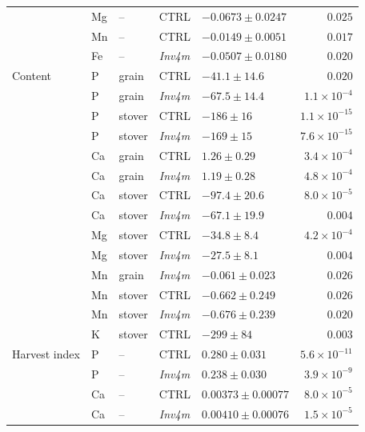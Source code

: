 \documentclass[9pt,twocolumn,twoside]{rilabRxiv}
\newcommand{\invfour}{\textit{Inv4m}\xspace}
\begin{document}
\begin{table}[!ht]
\begin{tabular}{lllllr}
 & Mg & -- & CTRL & $-0.0673 \pm 0.0247$ & $0.025$ \\
 & Mn & -- & CTRL & $-0.0149 \pm 0.0051$ & $0.017$ \\
 & Fe & -- & \invfour & $-0.0507 \pm 0.0180$ & $0.020$ \\
\hline
Content & P & grain & CTRL & $-41.1 \pm 14.6$ & $0.020$ \\
 & P & grain & \invfour & $-67.5 \pm 14.4$ & $1.1\times 10^{-4}$ \\
 & P & stover & CTRL & $-186 \pm 16$ & $1.1\times 10^{-15}$ \\
 & P & stover & \invfour & $-169 \pm 15$ & $7.6\times 10^{-15}$ \\
 & Ca & grain & CTRL & $1.26 \pm 0.29$ & $3.4\times 10^{-4}$ \\
 & Ca & grain & \invfour & $1.19 \pm 0.28$ & $4.8\times 10^{-4}$ \\
 & Ca & stover & CTRL & $-97.4 \pm 20.6$ & $8.0\times 10^{-5}$ \\
 & Ca & stover & \invfour & $-67.1 \pm 19.9$ & $0.004$ \\
 & Mg & stover & CTRL & $-34.8 \pm 8.4$ & $4.2\times 10^{-4}$ \\
 & Mg & stover & \invfour & $-27.5 \pm 8.1$ & $0.004$ \\
 & Mn & grain & \invfour & $-0.061 \pm 0.023$ & $0.026$ \\
 & Mn & stover & CTRL & $-0.662 \pm 0.249$ & $0.026$ \\
 & Mn & stover & \invfour & $-0.676 \pm 0.239$ & $0.020$ \\
 & K & stover & CTRL & $-299 \pm 84$ & $0.003$ \\
\hline
Harvest index & P & -- & CTRL & $0.280 \pm 0.031$ & $5.6\times 10^{-11}$ \\
 & P & -- & \invfour & $0.238 \pm 0.030$ & $3.9\times 10^{-9}$ \\
 & Ca & -- & CTRL & $0.00373 \pm 0.00077$ & $8.0\times 10^{-5}$ \\
 & Ca & -- & \invfour & $0.00410 \pm 0.00076$ & $1.5\times 10^{-5}$ \\
\hline
\end{tabular}
\end{table}
\end{document}
